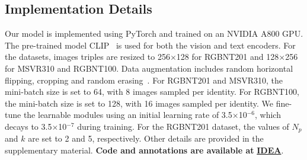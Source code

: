 \subsection{Implementation Details}
Our model is implemented using PyTorch and trained on an NVIDIA A800 GPU. 
%
The pre-trained model CLIP~\cite{radford2021learning} is used for both the vision and text encoders. 
%
For the datasets, images triples are resized to 256$\times$128 for RGBNT201 and 128$\times$256 for MSVR310 and RGBNT100. 
%
Data augmentation includes random horizontal flipping, cropping and random erasing~\cite{zhong2020random}.
%
For RGBNT201 and MSVR310, the mini-batch size is set to 64, with 8 images sampled per identity. 
%
For RGBNT100, the mini-batch size is set to 128, with 16 images sampled per identity.
%
We fine-tune the learnable modules using an initial learning rate of 3.5$\times$10$^{-6}$, which decays to 3.5$\times$10$^{-7}$ during training.
%
For the RGBNT201 dataset, the values of \(N_{p}\) and \(k\) are set to 2 and 5, respectively.
%
Other details are provided in the supplementary material.
%
\textbf{Code and annotations are available at } \href{https://github.com/924973292/IDEA}{\textbf{IDEA}}.
